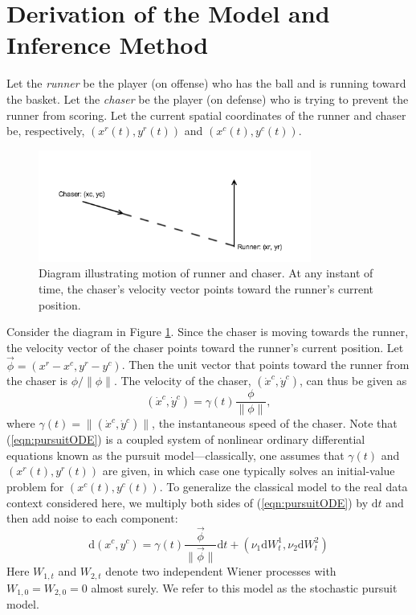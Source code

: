 \documentclass[graybox]{svmult}
\begin{document}
\section{Derivation of the Model and Inference Method}
\label{sec:2}
Let the \emph{runner} be the player (on offense) who has the ball and
is running toward the basket.  Let the \emph{chaser} be the player (on
defense) who is trying to prevent the runner from scoring.   Let the
current spatial coordinates of the runner and chaser be, respectively,
$(x^{r}(t), y^{r}(t))$ and $(x^{c}(t), y^{c}(t))$.

\begin{figure}[tb]
\centering
\includegraphics[width=0.8\textwidth]{pursuit.png}
\caption{Diagram illustrating motion of runner and chaser.  At any
  instant of time, the chaser's velocity vector points toward the
  runner's current position.}
\label{fig:pursuitdiagram}
\end{figure}

Consider the diagram in Figure \ref{fig:pursuitdiagram}.  Since the
chaser is moving towards the runner, the velocity vector of the chaser
points toward the runner's current position.  Let $\vec{\phi} = (x^{r}
- x^{c}, y^{r} - y^{c})$. Then the unit vector that points toward the
runner from the chaser is $\phi / \| \phi \|$.  The velocity of the chaser, $(\dot{x}^c, \dot{y}^c)$, can thus be given as
\begin{equation}
\label{eqn:pursuitODE}
(\dot{x}^c, \dot{y}^c) = \gamma(t) \frac{\phi}{\| \phi \|},
\end{equation}
where $\gamma(t) = \| (\dot{x}^c,\dot{y}^c) \|$, the instantaneous
speed of the chaser.  Note that (\ref{eqn:pursuitODE}) is a coupled
system of nonlinear ordinary differential equations known as the
pursuit model---classically, one assumes that
$\gamma(t)$ and $(x^{r}(t),y^{r}(t))$ are given, in which case one
typically solves an initial-value problem for $(x^{c}(t),y^{c}(t))$.
To generalize the classical model to the real data context considered
here, we multiply both sides of (\ref{eqn:pursuitODE}) by $\mathrm{d}t$ and
then add noise to each component:
\begin{equation}
\label{eqn:pursuitSDE}
\mathrm{d}(x^{c}, y^{c}) = \gamma(t) \frac{\vec{\phi}}{ \|
                           \vec{\phi} \| } \mathrm{d}t + (\nu_1
                         \mathrm{d}W^1_t, \nu_2 \mathrm{d}W^2_t)
\end{equation}
Here $W_{1,t}$ and $W_{2,t}$ denote two independent Wiener processes
with $W_{1,0} = W_{2,0} = 0$ almost surely.  We refer to this model as
the stochastic pursuit model.
\end{document}
